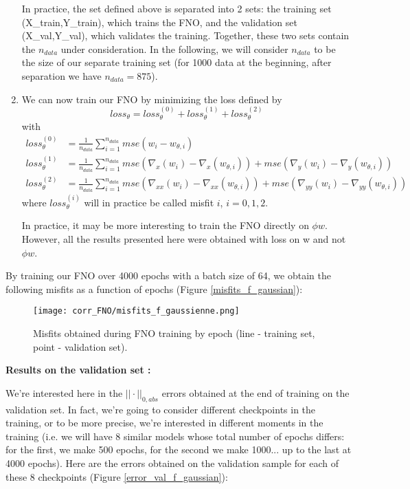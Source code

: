 \begin{enumerate}[label=\textbullet]
	\begin{Rem}
		In practice, the set defined above is separated into 2 sets: the training set (X\_train,Y\_train), which trains the FNO, and the validation set (X\_val,Y\_val), which validates the training. Together, these two sets contain the $n_{data}$ under consideration. In the following, we will consider $n_{data}$ to be the size of our separate training set (for 1000 data at the beginning, after separation we have $n_{data}=875$). 
	\end{Rem}
	\item We can now train our FNO by minimizing the loss defined by
	\begin{equation*}
		loss_\theta = loss_\theta^{(0)} + loss_\theta^{(1)} + loss_\theta^{(2)}
	\end{equation*}
	with 
	\begin{align*}
		loss_\theta^{(0)} &= \frac{1}{n_{data}}\sum_{i=1}^{n_{data}} mse(w_i-w_{\theta,i}) \\
		loss_\theta^{(1)} &= \frac{1}{n_{data}}\sum_{i=1}^{n_{data}} mse(\nabla_x(w_i)-\nabla_x(w_{\theta,i}))+mse(\nabla_y(w_i)-\nabla_y(w_{\theta,i})) \\
		loss_\theta^{(2)} &= \frac{1}{n_{data}}\sum_{i=1}^{n_{data}} mse(\nabla_{xx}(w_i)-\nabla_{xx}(w_{\theta,i})) + mse(\nabla_{yy}(w_i)-\nabla_{yy}(w_{\theta,i}))
	\end{align*}
	where $loss_\theta^{(i)}$ will in practice be called misfit $i$, $i=0,1,2$.
	\begin{Rem}
		In practice, it may be more interesting to train the FNO directly on $\phi w$. However, all the results presented here were obtained with loss on w and not $\phi w$.
	\end{Rem}
\end{enumerate}

By training our FNO over 4000 epochs with a batch size of 64, we obtain the following misfits as a function of epochs (Figure \ref{misfits_f_gaussian}):

\begin{figure}[H]
	\centering
	\texttt{[image: corr\_FNO/misfits\_f\_gaussienne.png]}
	\caption{Misfits obtained during FNO training by epoch (line - training set, point - validation set).}
	\label{misfits_f_gaussienne}
\end{figure}

\textbf{Results on the validation set :}

We're interested here in the $||\cdot||_{0,abs}$ errors obtained at the end of training on the validation set. In fact, we're going to consider different checkpoints in the training, or to be more precise, we're interested in different moments in the training (i.e. we will have 8 similar models whose total number of epochs differs: for the first, we make 500 epochs, for the second we make 1000... up to the last at 4000 epochs). Here are the errors obtained on the validation sample for each of these 8 checkpoints (Figure \ref{error_val_f_gaussian}):


